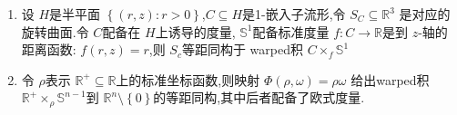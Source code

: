 \documentclass[../../几何与拓扑.tex]{subfiles}
\begin{document}
\begin{example}
    \begin{enumerate}
        \item 设 \(  H  \)是半平面 \(  \left\{ \left( r,z \right):r> 0  \right\}  \),\(  C\subseteq H  \)是1-嵌入子流形,令 \(  S_{C}\subseteq \mathbb{R} ^{3}  \)    是对应的旋转曲面.令 \(  C  \)配备在 \(  H  \)上诱导的度量, \(  \mathbb{S}^{1}  \)配备标准度量 \(  f: C\to \mathbb{R}   \)是到 \(  z  \)-轴的距离函数: \(  f\left( r,z \right)= r   \),则 \(  S_{c}  \)等距同构于 warped积 \(  C \times  _{f}\mathbb{S}^{1}  \)        
        \item 令 \(  \rho   \)表示 \(  \mathbb{R} ^{+ }\subseteq \mathbb{R}   \)上的标准坐标函数,则映射 \(  \Phi \left( \rho , \omega  \right)= \rho  \omega    \)   给出warped积 \(  \mathbb{R} ^{+ }\times  _{\rho }\mathbb{S}^{n-1}  \)到 \(  \mathbb{R} ^{n}\setminus \left\{ 0 \right\}  \)的等距同构,其中后者配备了欧式度量.  
    \end{enumerate}
    
\end{example}
\end{document}
